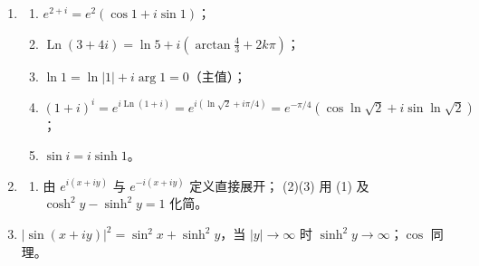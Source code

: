 \begin{enumerate}
\begin{enumerate}
    \(f+g\)
    仍处处不可导？更恰当举例：\(f(z)=\dfrac1z\)，\(g(z)=-\dfrac1z+\dfrac1{z-1}\)
    等；结论是命题不真；
  \item
    假：偏导数存在不足以保证 C-R 满足；
  \item
    真：\(u\) 为常数时，由 C-R 方程 \(v_x=-u_y=0,\ v_y=u_x=0\)，所以
    \(v\) 也为常数，\(f\) 为常数。
  \end{enumerate}
\item
  \begin{enumerate}
  \def\labelenumii{(\arabic{enumii})}
  \tightlist
  \item
    \(e^{2+i}=e^2(\cos1+i\sin1)\)；
  \item
    \(\operatorname{Ln}(3+4i)=\ln5+i(\arctan\frac43+2k\pi)\)；
  \item
    \(\ln1=\ln|1|+i\arg1=0\)（主值）；
  \item
    \((1+i)^i=e^{i\operatorname{Ln}(1+i)}=e^{i(\ln\sqrt2+i\pi/4)}=e^{-\pi/4}(\cos\ln\sqrt2+i\sin\ln\sqrt2)\)；
  \item
    \(\sin i=i\sinh1\)。
  \end{enumerate}
\item
  \begin{enumerate}
  \def\labelenumii{(\arabic{enumii})}
  \tightlist
  \item
    由 \(e^{i(x+iy)}\) 与 \(e^{-i(x+iy)}\) 定义直接展开； (2)(3) 用 (1)
    及 \(\cosh^2y-\sinh^2y=1\) 化简。
  \end{enumerate}
\item
  \(|\sin(x+iy)|^2=\sin^2x+\sinh^2y\)，当 \(|y|\to\infty\) 时
  \(\sinh^2y\to\infty\)；\(\cos\) 同理。
\end{enumerate}
